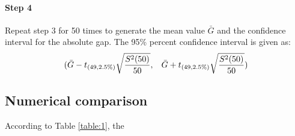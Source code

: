 \documentclass[preprint,12pt]{elsarticle}
\begin{document}
\paragraph{Step 4}
Repeat step 3 for 50 times to generate the mean value $\bar{G}$ and the confidence interval for the absolute gap. The 95\% percent confidence interval is given as:
$$(\bar{G}-t_{(49,2.5\%)}\sqrt{\frac{S^{2}(50)}{50}},\hspace{3mm}\bar{G}+t_{(49,2.5\%)}\sqrt{\frac{S^{2}(50)}{50}} ) $$


\subsection{Numerical comparison}
According to Table \ref{table:1}, the
\end{document}
